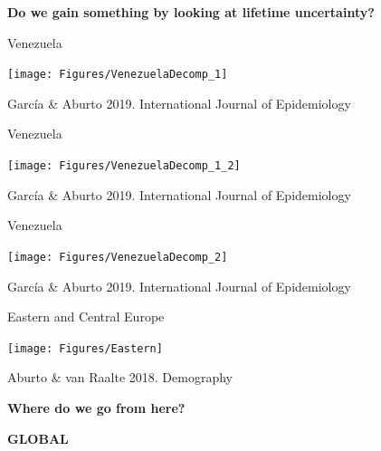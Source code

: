 \documentclass[xcolor={dvipsnames}]{beamer}
\begin{document}
\begin{frame}
\LARGE{
\begin{center}
\textbf{Do we gain something by looking at lifetime uncertainty?}
\end{center}
}
\end{frame}


\begin{frame}
	\begin{center}
		\Large{Venezuela}
	\end{center}

	\hspace*{-1cm}   
	\texttt{[image: Figures/VenezuelaDecomp\_1]}	

\tiny{Garc\'ia \& Aburto 2019. International Journal of Epidemiology}
\end{frame}

\begin{frame}
	\begin{center}
		\Large{Venezuela}
	\end{center}

	\hspace*{-1cm}   
	\texttt{[image: Figures/VenezuelaDecomp\_1\_2]}	
	
\tiny{Garc\'ia \& Aburto 2019. International Journal of Epidemiology}
\end{frame}


\begin{frame}
	\begin{center}
		\Large{Venezuela}
	\end{center}

	\hspace*{-1cm}   
	\texttt{[image: Figures/VenezuelaDecomp\_2]}	
	
\tiny{Garc\'ia \& Aburto 2019. International Journal of Epidemiology}

\end{frame}


\begin{frame}
	\begin{center}
		\Large{Eastern and Central Europe}
	\end{center}

	\texttt{[image: Figures/Eastern]}	
	
\tiny{Aburto \& van Raalte 2018. Demography}

\end{frame}



\begin{frame}
\Huge{
\begin{center}
\textbf{Where do we go from here?} \pause

\bigskip

\textbf{GLOBAL}
\end{center}
}
\end{frame}
\end{document}
